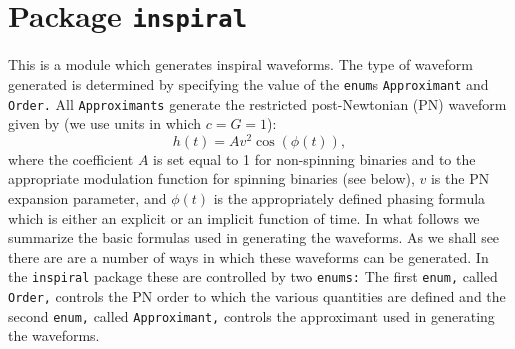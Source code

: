 \chapter{Package \texttt{inspiral}}

This is a module which generates inspiral waveforms. The type of waveform generated
is determined by specifying the value of the {\tt enum}s {\tt Approximant} and {\tt Order.}
All {\tt Approximants} generate the restricted post-Newtonian (PN) waveform given by (we
use units in which $c=G=1$):
\begin{equation}
h(t) = A v^2 \cos(\phi(t)),
\end{equation}
where the coefficient $A$ is set equal to 1 for non-spinning binaries
and to the appropriate modulation function for spinning binaries (see below),
$v$ is the PN expansion parameter, and $\phi(t)$ is the appropriately
defined phasing formula which is either an explicit or an implicit
function of time.  In what follows we summarize the basic formulas used
in generating the waveforms. As we shall see there are are a number of
ways in which these waveforms can be generated.  In the {\tt inspiral} package
these are controlled by two {\tt enums:} The first {\tt enum,} called {\tt Order,}
controls the PN order to which the various quantities are defined and
the second {\tt enum,} called {\tt Approximant,} controls the approximant used
in generating the waveforms.

